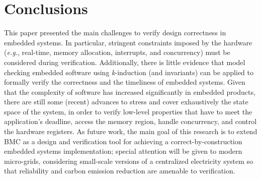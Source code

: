\documentclass{acm_sen_article}
\begin{document}
\section{Conclusions}
\label{conclusions}

This paper presented the main challenges to verify design correctness in embedded systems. In particular, stringent constraints imposed by the hardware ({\it e.g.}, real-time, memory allocation, interrupts, and concurrency) must be considered during verification. Additionally, there is little evidence that model checking embedded software using \textit{k}-induction (and invariants) can be applied to formally verify the correctness and the timeliness of embedded systems. Given that the complexity of software has increased significantly in embedded products, there are still some (recent) advances to stress and cover exhaustively the state space of the system, in order to verify low-level properties that have to meet the application's deadline, access the memory region, handle concurrency, and control the hardware registers. As future work, the main goal of this research is to extend BMC as a design and verification tool for achieving a correct-by-construction embedded systems implementation; special attention will be given to modern micro-grids, considering small-scale versions of a centralized electricity system so that reliability and carbon emission reduction are amenable to verification.






\end{document}
